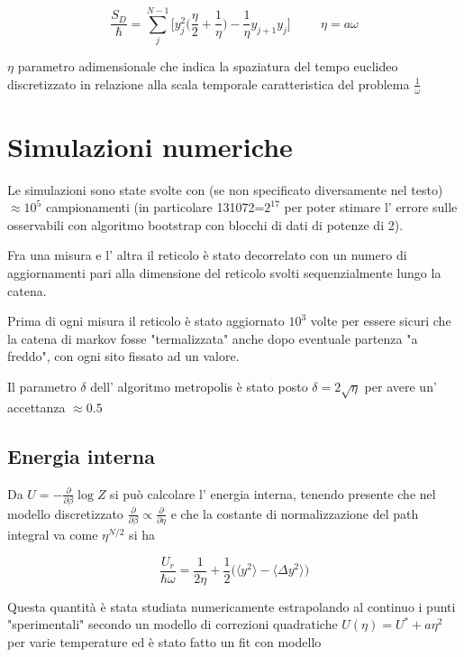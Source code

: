 \documentclass{article}
\begin{document}
\begin{equation}
\frac{S_D}{\hbar} = \displaystyle\sum_j^{N-1} \Bigg[y^2_j\Big(\frac{\eta}{2}+\frac{1}{\eta}\Big)
-\frac{1}{\eta}y_{j+1}y_j\Bigg] \hspace{1cm} \eta = a\omega 
\end{equation}

$\eta$ parametro adimensionale che indica la spaziatura del tempo euclideo discretizzato in relazione alla scala temporale caratteristica del problema $\displaystyle\frac{1}{\omega}$

\newpage
\section{Simulazioni numeriche}

Le simulazioni sono state svolte con (se non specificato diversamente nel testo) $\approx 10^5$ campionamenti (in particolare 131072=$2^{17}$ per poter stimare l' errore sulle osservabili con algoritmo bootstrap con blocchi di dati di potenze di 2).

Fra una misura e l' altra il reticolo è stato decorrelato con un numero di aggiornamenti pari alla dimensione del reticolo svolti sequenzialmente lungo la catena. 

Prima di ogni misura il reticolo è stato aggiornato $10^3$ volte per essere sicuri che la catena di markov fosse "termalizzata" anche dopo eventuale partenza "a freddo", con ogni sito fissato ad un valore.

Il parametro $\delta$ dell' algoritmo metropolis  è stato posto $\delta=2\sqrt{\eta}$ per avere un' accettanza $\approx 0.5$
\subsection{Energia interna}

Da $U = -\frac{\partial}{\partial\beta}\log Z$ si può calcolare l' energia interna, tenendo presente che nel modello discretizzato $\frac{\partial}{\partial\beta}\propto \frac{\partial}{\partial\eta}$ e che la costante di normalizzazione del path integral va come $\eta^{N/2}$ si ha

\begin{equation}
    \frac{U_r}{\hbar\omega} = \frac{1}{2\eta} + \frac{1}{2}\Big(\langle y^2\rangle - \langle \Delta y^2 \rangle\Big)
\end{equation}

Questa quantità è stata studiata numericamente estrapolando al continuo i punti "sperimentali" secondo un modello di correzioni quadratiche $U(\eta) = U^{*}+a\eta^2$ per varie temperature ed è stato fatto un fit con modello 
\end{document}
